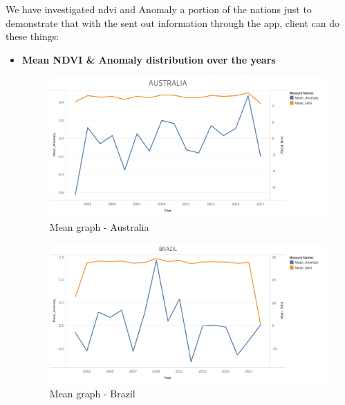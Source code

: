 We have investigated \gls{ndvi} and Anomaly a portion of the nations just to demonstrate that with the sent out information through the app, client can do these things:

\newpage

\begin{itemize}
    \item \textbf{Mean NDVI \& Anomaly distribution over the years}
    
     \begin{figure}[H]
            \centering
            \includegraphics[width=1.0\linewidth]{figures/ch5/Mean/AUSTRALIA_mean.png}
            \caption{Mean graph - Australia}\label{Fig:AUSTRALIA_mean}
    \end{figure}
    
    \begin{figure}[H]
            \centering
            \includegraphics[width=1.0\linewidth]{figures/ch5/Mean/BRAZIL_mean.png}
            \caption{Mean graph - Brazil}\label{Fig:BRAZIL_mean}
    \end{figure}
    

\end{itemize}
